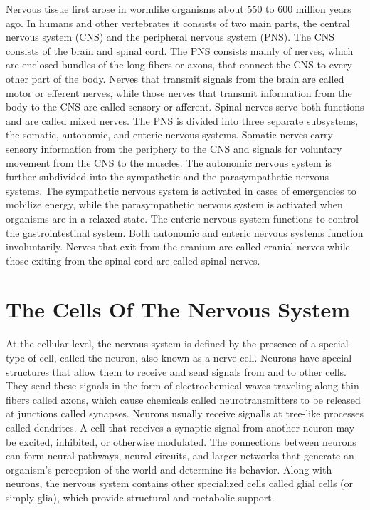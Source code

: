 Nervous tissue first arose in wormlike organisms about 550 to 600 million years ago. In humans and other vertebrates it consists of two main parts, the central nervous system (CNS) and the peripheral nervous system (PNS). The CNS consists of the brain and spinal cord. The PNS consists mainly of nerves, which are enclosed bundles of the long fibers or axons, that connect the CNS to every other part of the body. Nerves that transmit signals from the brain are called motor or efferent nerves, while those nerves that transmit information from the body to the CNS are called sensory or afferent. Spinal nerves serve both functions and are called mixed nerves. The PNS is divided into three separate subsystems, the somatic, autonomic, and enteric nervous systems. Somatic nerves carry sensory information from the periphery to the CNS and signals for voluntary movement from the CNS to the muscles. The autonomic nervous system is further subdivided into the sympathetic and the parasympathetic nervous systems. The sympathetic nervous system is activated in cases of emergencies to mobilize energy, while the parasympathetic nervous system is activated when organisms are in a relaxed state. The enteric nervous system functions to control the gastrointestinal system. Both autonomic and enteric nervous systems function involuntarily. Nerves that exit from the cranium are called cranial nerves while those exiting from the spinal cord are called spinal nerves.

\hypertarget{the-cells-of-the-nervous-system}{%
\section{The Cells Of The Nervous System}\label{the-cells-of-the-nervous-system}}

At the cellular level, the nervous system is defined by the presence of a special type of cell, called the neuron, also known as a nerve cell. Neurons have special structures that allow them to receive and send signals from and to other cells. They send these signals in the form of electrochemical waves traveling along thin fibers called axons, which cause chemicals called neurotransmitters to be released at junctions called synapses. Neurons usually receive signalls at tree-like processes called dendrites. A cell that receives a synaptic signal from another neuron may be excited, inhibited, or otherwise modulated. The connections between neurons can form neural pathways, neural circuits, and larger networks that generate an organism's perception of the world and determine its behavior. Along with neurons, the nervous system contains other specialized cells called glial cells (or simply glia), which provide structural and metabolic support.



